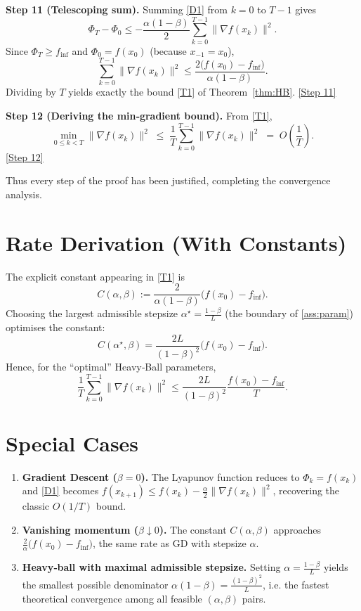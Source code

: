 \documentclass[11pt]{article}
\begin{document}
\medskip
\noindent\textbf{Step 11 (Telescoping sum).}
Summing \eqref{D1} from $k=0$ to $T-1$ gives
\[
\Phi_{T}-\Phi_{0}
\le -\frac{\alpha(1-\beta)}{2}\sum_{k=0}^{T-1}\|\nabla f(x_{k})\|^{2}.
\]
Since $\Phi_{T}\ge f_{\inf}$ and $\Phi_{0}=f(x_{0})$ (because $x_{-1}=x_{0}$),
\[
\sum_{k=0}^{T-1}\|\nabla f(x_{k})\|^{2}
\le \frac{2\big(f(x_{0})-f_{\inf}\big)}{\alpha(1-\beta)}.
\tag{D2}
\]
Dividing by $T$ yields exactly the bound \eqref{T1} of Theorem~\ref{thm:HB}.
\underline{[Step 11]}

\medskip
\noindent\textbf{Step 12 (Deriving the min‑gradient bound).}
From \eqref{T1},
\[
\min_{0\le k<T}\|\nabla f(x_{k})\|^{2}
\;\le\;
\frac{1}{T}\sum_{k=0}^{T-1}\|\nabla f(x_{k})\|^{2}
\;=\;O\!\left(\frac{1}{T}\right).
\]
\underline{[Step 12]}

Thus every step of the proof has been justified, completing the convergence analysis.

\section*{Rate Derivation (With Constants)}
The explicit constant appearing in \eqref{T1} is
\[
C(\alpha,\beta):=
\frac{2}{\alpha(1-\beta)}\bigl(f(x_{0})-f_{\inf}\bigr).
\]
Choosing the largest admissible stepsize
$\alpha^{\star}=\frac{1-\beta}{L}$ (the boundary of \eqref{ass:param})
optimises the constant:
\[
C(\alpha^{\star},\beta)=\frac{2L}{(1-\beta)^{2}}\bigl(f(x_{0})-f_{\inf}\bigr).
\]
Hence, for the “optimal” Heavy‑Ball parameters,
\[
\frac{1}{T}\sum_{k=0}^{T-1}\|\nabla f(x_{k})\|^{2}
\le
\frac{2L}{(1-\beta)^{2}}\frac{f(x_{0})-f_{\inf}}{T}.
\]

\section*{Special Cases}
\begin{enumerate}[label=\arabic*.]
\item \textbf{Gradient Descent ($\beta=0$).}  The Lyapunov function reduces to
$\Phi_{k}=f(x_{k})$ and \eqref{D1} becomes
$f(x_{k+1})\le f(x_{k})-\frac{\alpha}{2}\|\nabla f(x_{k})\|^{2}$,
recovering the classic $O(1/T)$ bound.

\item \textbf{Vanishing momentum ($\beta\downarrow0$).}  The constant
$C(\alpha,\beta)$ approaches $\frac{2}{\alpha}\bigl(f(x_{0})-f_{\inf}\bigr)$,
the same rate as GD with stepsize $\alpha$.

\item \textbf{Heavy‑ball with maximal admissible stepsize.}
Setting $\alpha=\frac{1-\beta}{L}$ yields the smallest possible denominator
$\alpha(1-\beta)=\frac{(1-\beta)^{2}}{L}$, i.e. the fastest theoretical
convergence among all feasible $(\alpha,\beta)$ pairs.
\end{enumerate}
\end{document}
